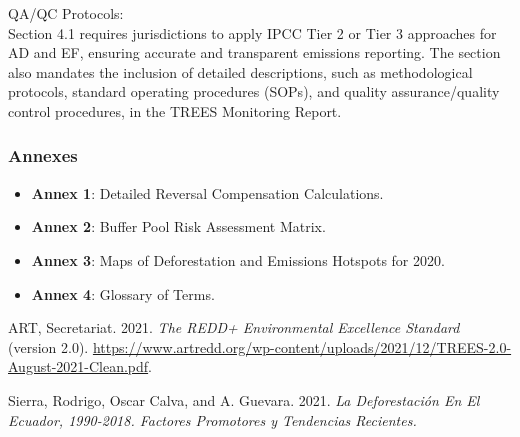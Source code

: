 \documentclass[
  letterpaper,
  DIV=11,
  numbers=noendperiod]{scrartcl}
\newlength{\cslhangindent}
\newenvironment{CSLReferences}[2] %
 {\begin{list}{}{%
  \setlength{\itemindent}{0pt}
  \setlength{\leftmargin}{0pt}
  \setlength{\parsep}{0pt}
  \ifodd #1
   \setlength{\leftmargin}{\cslhangindent}
   \setlength{\itemindent}{-1\cslhangindent}
  \fi
  \setlength{\itemsep}{#2\baselineskip}}}
 {\end{list}}
\begin{document}
QA/QC Protocols:\\
Section 4.1 requires jurisdictions to apply IPCC Tier 2 or Tier 3
approaches for AD and EF, ensuring accurate and transparent emissions
reporting. The section also mandates the inclusion of detailed
descriptions, such as methodological protocols, standard operating
procedures (SOPs), and quality assurance/quality control procedures, in
the TREES Monitoring Report\hspace{0pt}\hspace{0pt}.

\hypertarget{annexes}{%
\subsubsection{Annexes}\label{annexes}}

\begin{itemize}
\item
  \textbf{Annex 1}: Detailed Reversal Compensation Calculations.
\item
  \textbf{Annex 2}: Buffer Pool Risk Assessment Matrix.
\item
  \textbf{Annex 3}: Maps of Deforestation and Emissions Hotspots for
  2020.
\item
  \textbf{Annex 4}: Glossary of Terms.
\end{itemize}

\hypertarget{refs}{}
\begin{CSLReferences}{1}{0}
\leavevmode{}%
ART, Secretariat. 2021. \emph{The {REDD}+ {Environmental Excellence
Standard}} (version 2.0).
\url{https://www.artredd.org/wp-content/uploads/2021/12/TREES-2.0-August-2021-Clean.pdf}.

\leavevmode{}%
Sierra, Rodrigo, Oscar Calva, and A. Guevara. 2021. \emph{La
{Deforestación} En El {Ecuador}, 1990-2018. {Factores} Promotores y
Tendencias Recientes.}

\end{CSLReferences}
\end{document}
